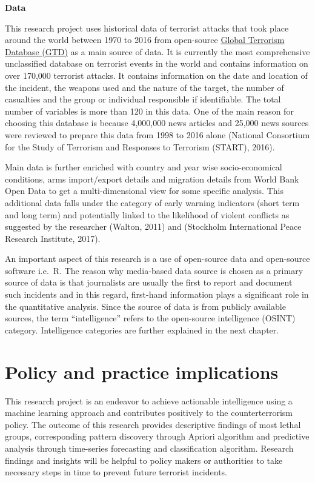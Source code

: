 \documentclass[11pt,oneside,a4paper]{reedthesis}
\begin{document}
\textbf{Data}

This research project uses historical data of terrorist attacks that
took place around the world between 1970 to 2016 from open-source
\href{https://www.start.umd.edu/gtd/about/}{Global Terrorism Database
(GTD)} as a main source of data. It is currently the most comprehensive
unclassified database on terrorist events in the world and contains
information on over 170,000 terrorist attacks. It contains information
on the date and location of the incident, the weapons used and the
nature of the target, the number of casualties and the group or
individual responsible if identifiable. The total number of variables is
more than 120 in this data. One of the main reason for choosing this
database is because 4,000,000 news articles and 25,000 news sources were
reviewed to prepare this data from 1998 to 2016 alone (National
Consortium for the Study of Terrorism and Responses to Terrorism
(START), 2016).

Main data is further enriched with country and year wise
socio-economical conditions, arms import/export details and migration
details from World Bank Open Data to get a multi-dimensional view for
some specific analysis. This additional data falls under the category of
early warning indicators (short term and long term) and potentially
linked to the likelihood of violent conflicts as suggested by the
researcher (Walton, 2011) and (Stockholm International Peace Research
Institute, 2017).

An important aspect of this research is a use of open-source data and
open-source software i.e.~R. The reason why media-based data source is
chosen as a primary source of data is that journalists are usually the
first to report and document such incidents and in this regard,
first-hand information plays a significant role in the quantitative
analysis. Since the source of data is from publicly available sources,
the term ``intelligence'' refers to the open-source intelligence (OSINT)
category. Intelligence categories are further explained in the next
chapter.

\section*{Policy and practice
implications}\label{policy-and-practice-implications}

This research project is an endeavor to achieve actionable intelligence
using a machine learning approach and contributes positively to the
counterterrorism policy. The outcome of this research provides
descriptive findings of most lethal groups, corresponding pattern
discovery through Apriori algorithm and predictive analysis through
time-series forecasting and classification algorithm. Research findings
and insights will be helpful to policy makers or authorities to take
necessary steps in time to prevent future terrorist incidents.
\end{document}
